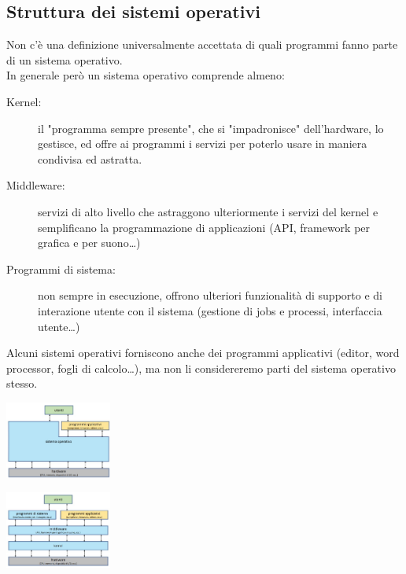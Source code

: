 \begin{description}
\section{Struttura dei sistemi operativi}
Non c'è una definizione universalmente accettata di quali programmi fanno parte di un sistema operativo.\\
In generale però un sistema operativo comprende almeno:
\begin{description}
    \item[Kernel:] il "programma sempre presente", che si "impadronisce" dell'hardware, lo gestisce, ed offre ai programmi i servizi per poterlo usare in maniera condivisa ed astratta.
    \item[Middleware:] servizi di alto livello che astraggono ulteriormente i servizi del kernel e semplificano la programmazione di applicazioni (API, framework per grafica e per suono\dots)
    \item[Programmi di sistema:] non sempre in esecuzione, offrono ulteriori funzionalità di supporto e di interazione utente con il sistema (gestione di jobs e processi, interfaccia utente\dots)
\end{description}
Alcuni sistemi operativi forniscono anche dei programmi applicativi (editor, word processor, fogli di calcolo…), ma non li considereremo parti del sistema operativo stesso.
\begin{center}
    \includegraphics[width=35mm]{images/SO/SO_sistema_di_elaborazione2.jpg}
\end{center}
\begin{center}
    \includegraphics[width=35mm]{images/SO/SO_sistema_di_elaborazione3.jpg}
\end{center}


\end{description}
